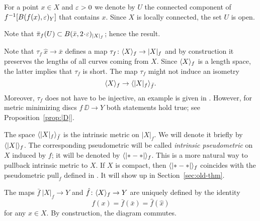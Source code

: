 \documentclass{article}
\begin{document}
For a point $x\in X$ and $\varepsilon>0$ we denote by $U$ the connected component of $f^{-1}[B(f(x),\varepsilon)_{Y}]$ that contains $x$.
Since $X$ is locally connected, the set $U$ is open.

Note that $\bar\pi_f(U)\subset B(\bar x,2\cdot \eps)_{|X|_f}$;
hence the result.
\qeds



\begin{wrapfigure}{R}{37 mm}
\label{diagram-page}
\end{wrapfigure}

Note that $\tau_f\: \hat x\to \bar x$ defines a map $\tau_f\: \<X\>_f\zz\to |X|_f$ and by construction it preserves the lengths of
all curves coming from $X$.
Since $\langle X\rangle_f$ is a length space, the latter implies that $\tau_f$ is short.
The map $\tau_f$ might not induce an isometry
\[\langle X\rangle_f\to\langle|X|_f\rangle_{\bar f}.\]
Moreover, $\tau_f$ does not have to be injective, an example is given in \cite[4.2]{petrunin-intrinisic}.
However, for metric minimizing discs $f\:\DD\to Y$ both statements hold true; see
Proposition~\ref{prop:|D|}.

The space $\langle|X|_f\rangle_{\bar f}$ is the intrinsic metric on $|X|_f$.
We will denote it briefly by $\langle|X|\rangle_f$.
The corresponding pseudometric will be called \emph{intrinsic pseudometric} on $X$ induced by $f$; it will be denoted by $\langle|{*}-{*}|\rangle_f$.
This is a more natural way to pullback intrinsic metric to $X$.
If $X$ is compact, then $\langle|{*}-{*}|\rangle_f$ coincides with the pseudometric $\mathrm{pull}_f$ defined in \cite{petrunin-intrinisic}.
It will show up in Section~\ref{sec:old-thm}.

The maps $\bar f\:|X|_f\to Y$ and $ \hat f\colon\langle X\rangle_f\to Y$ are uniquely defined by the identity
\[f(x)=\bar f(\bar x)=  \hat f( \hat x)\] for any $x\in X$.
By construction, the diagram commutes.
\end{document}
